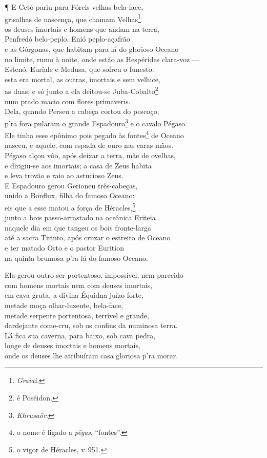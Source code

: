 ¶ E Cetó pariu para Fórcis velhas bela-face,\\
grisalhas de nascença, que chamam Velhas\footnote{\emph{Graiai}.}\\
os deuses imortais e homens que andam na terra,\\
Penfredó belo-peplo, Enió peplo-açafrão\\
e as Górgonas, que habitam para lá do glorioso Oceano\\
no limite, rumo à noite, onde estão as Hespérides clara-voz --- \\
Estenó, Euríale e Medusa, que sofreu o funesto:\\
esta era mortal, as outras, imortais e sem velhice,\\
as duas; e só junto a ela deitou-se Juba-Cobalto\footnote{é Posêidon.}\\
num prado macio com flores primaveris.\\
Dela, quando Perseu a cabeça cortou do pescoço, \\
p'ra fora pularam o grande Espadouro\footnote{\emph{Khrusaōr}.} e o cavalo Pégaso.\\
Ele tinha esse epônimo pois pegado às fontes\footnote{o nome é ligado a \emph{pēgas}, ``fontes''.} de Oceano\\
nasceu, e aquele, com espada de ouro nas caras mãos.\\
Pégaso alçou vôo, após deixar a terra, mãe de ovelhas,\\
e dirigiu-se aos imortais; a casa de Zeus habita \\
e leva trovão e raio ao astucioso Zeus.\\
E Espadouro gerou Gerioneu três-cabeças,\\
unido a Bonflux, filha do famoso Oceano:\\
eis que a esse matou a força de Héracles,\footnote{o vigor de Héracles, v.\,951.}\\
junto a bois passo-arrastado na oceânica Eriteia \\
naquele dia em que tangeu os bois fronte-larga\\
até a sacra Tirinto, após cruzar o estreito de Oceano\\
e ter matado Orto e o pastor Euritíon\\
na quinta brumosa p'ra lá do famoso Oceano.

\quad{}Ela gerou outro ser portentoso, impossível, nem parecido \\
com homens mortais nem com deuses imortais,\\
em cava gruta, a divina Équidna juízo-forte,\\
metade moça olhar-luzente, bela-face,\\
metade serpente portentosa, terrível e grande,\\
dardejante come-cru, sob os confins da numinosa terra. \\
Lá fica sua caverna, para baixo, sob cava pedra,\\
longe de deuses imortais e homens mortais,\\
onde os deuses lhe atribuíram casa gloriosa p'ra morar.

